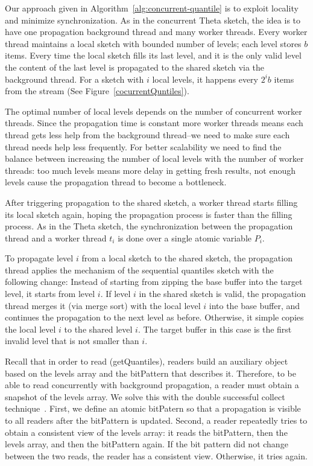Our approach given in  Algorithm~\ref{alg:concurrent-quantile} is to exploit locality and minimize
synchronization.
As in the concurrent Theta sketch, the idea is to have one propagation
background thread and many worker threads.
Every worker thread maintains a local sketch with bounded number
of levels; each level stores $b$ items. 
Every time the local sketch fills its last level, and it is the only valid level the content of the last level is propagated to the
shared sketch via the background thread.
For a sketch with $i$ local levels, it happens every $2^ib$
items from the stream (See Figure~\ref{cocurrentQuntiles}).



The optimal number of local levels depends on the number of
concurrent worker threads.
Since  the propagation time is constant more worker threads means each thread gets
less help from the background thread--we need to make sure each thread needs help
less frequently.
For better scalability we need to find the balance between increasing the number of
local levels with the number of worker threads: too much levels means more delay in getting fresh results, not enough levels cause the propagation thread to become a bottleneck.

After triggering propagation to the shared sketch,
a worker thread starts filling its local sketch again, hoping the
propagation process is faster than the filling process.
As in the Theta sketch, the synchronization between the
propagation thread and a worker thread $t_i$ is done over a
single atomic variable $P_i$.

To propagate level $i$ from a local sketch to the shared sketch,
the propagation thread applies the mechanism of the
sequential quantiles sketch with the following
change:
Instead of starting from zipping the base buffer
into the target level, it starts from level $i$.
If level $i$ in the shared sketch is valid, the propagation
thread merges it (via merge sort) with the local level $i$ into
the base buffer, and continues the propagation to the next level
as before.
Otherwise, it simple copies the local level $i$ to the shared level
$i$.
The target buffer in this case is the first invalid level that is
not smaller than $i$.

Recall that in order to read (getQuantiles), readers build an
auxiliary object based on the levels array and the bitPattern
that describes it.
Therefore, to be able to read concurrently with
background propagation, a reader must obtain a snapshot of the
levels array.
We solve this with the double successful collect technique~\cite{}.
First, we define an atomic bitPatern so
that a propagation is visible to all readers after the
bitPattern is updated.
Second, a reader repeatedly tries to obtain a consistent view of
the levels array: it reads the bitPattern, then the levels array,
and then the bitPattern again.
If the bit pattern did not change between the two reads, the
reader has a consistent view.
Otherwise, it tries again.

